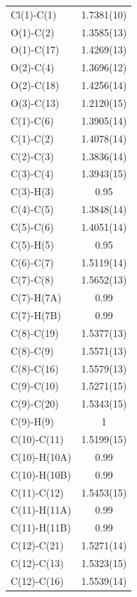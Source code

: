 \begin{center}
\tablefirsthead{%
\toprule}
\tablelasttail{\bottomrule}
{\footnotesize \singlespacing
\begin{supertabular}{p{1.5in}c}
Cl(1)-C(1) &1.7381(10)\\
O(1)-C(2) &1.3585(13)\\
O(1)-C(17) &1.4269(13)\\
O(2)-C(4) &1.3696(12)\\
O(2)-C(18) &1.4256(14)\\
O(3)-C(13) &1.2120(15)\\
C(1)-C(6) &1.3905(14)\\
C(1)-C(2) &1.4078(14)\\
C(2)-C(3) &1.3836(14)\\
C(3)-C(4) &1.3943(15)\\
C(3)-H(3) &0.95\\
C(4)-C(5) &1.3848(14)\\
C(5)-C(6) &1.4051(14)\\
C(5)-H(5) &0.95\\
C(6)-C(7) &1.5119(14)\\
C(7)-C(8) &1.5652(13)\\
C(7)-H(7A) &0.99\\
C(7)-H(7B) &0.99\\
C(8)-C(19) &1.5377(13)\\
C(8)-C(9) &1.5571(13)\\
C(8)-C(16) &1.5579(13)\\
C(9)-C(10) &1.5271(15)\\
C(9)-C(20) &1.5343(15)\\
C(9)-H(9) &1\\
C(10)-C(11) &1.5199(15)\\
C(10)-H(10A) &0.99\\
C(10)-H(10B) &0.99\\
C(11)-C(12) &1.5453(15)\\
C(11)-H(11A) &0.99\\
C(11)-H(11B) &0.99\\
C(12)-C(21) &1.5271(14)\\
C(12)-C(13) &1.5323(15)\\
C(12)-C(16) &1.5539(14)\\

\end{supertabular}}
\end{center}
